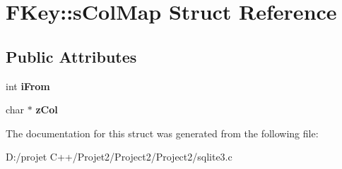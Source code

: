 \hypertarget{struct_f_key_1_1s_col_map}{}\section{F\+Key\+:\+:s\+Col\+Map Struct Reference}
\label{struct_f_key_1_1s_col_map}
\subsection*{Public Attributes}
\begin{DoxyCompactItemize}
\item 
\mbox{\label{struct_f_key_1_1s_col_map_a2b0ed19d4924a93d1f3f14f891b176ed}} 
int {\bfseries i\+From}
\item 
\mbox{\label{struct_f_key_1_1s_col_map_a4cdef475be73cc460873051a2c2c2937}} 
char $\ast$ {\bfseries z\+Col}
\end{DoxyCompactItemize}


The documentation for this struct was generated from the following file\+:\begin{DoxyCompactItemize}
\item 
D\+:/projet C++/\+Projet2/\+Project2/\+Project2/sqlite3.\+c\end{DoxyCompactItemize}
